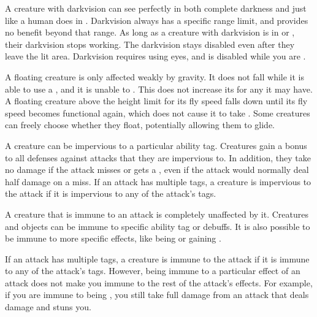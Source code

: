   A creature with darkvision can see perfectly in both complete darkness and  just like a human does in .
  Darkvision always has a specific range limit, and provides no benefit beyond that range.
  As long as a creature with darkvision is in  or , their darkvision stops working.
  The darkvision  stays disabled even after they leave the lit area.
  Darkvision requires using eyes, and is disabled while you are \dazzled.

  A floating creature is only affected weakly by gravity.
  It does not fall while it is able to use a , and it is unable to .
  This does not increase its  for any  it may have.
  A floating creature above the height limit for its fly speed falls down until its fly speed becomes functional again, which does not cause it to take .
  Some creatures can freely choose whether they float, potentially allowing them to glide.

  A creature can be impervious to a particular ability tag.
  Creatures gain a  bonus to all defenses against attacks that they are impervious to.
  In addition, they take no damage if the attack misses or gets a , even if the attack would normally deal half damage on a miss.
  If an attack has multiple tags, a creature is impervious to the attack if it is impervious to any of the attack's tags.

  A creature that is immune to an attack is completely unaffected by it.
  Creatures and objects can be immune to specific ability tag or debuffs.
  It is also possible to be immune to more specific effects, like being \grappled or gaining .

  If an attack has multiple tags, a creature is immune to the attack if it is immune to any of the attack's tags.
  However, being immune to a particular effect of an attack does not make you immune to the rest of the attack's effects.
  For example, if you are immune to being \stunned, you still take full damage from an attack that deals damage and stuns you.

